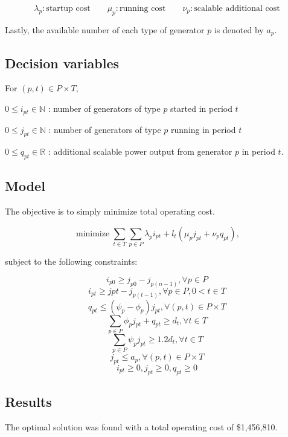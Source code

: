 \documentclass[11pt,oneside]{article}
\newcommand{\Real}{\mathbb{R}}
\newcommand{\Nat}{\mathbb{N}}
\DeclareMathOperator*{\minimize}{minimize}
\begin{document}
$$
\lambda_p : \textrm{startup cost}
\quad\quad
\mu_p : \textrm{running cost}
\quad\quad
\nu_p : \textrm{scalable additional cost}
$$

Lastly, the available number of each type of generator $p$ is denoted by $a_p$.

\subsection{Decision variables}

For $(p, t) \in P \times T$,

$0 \leq i_{pt}\in\Nat$ : number of generators of type $p$ started in period $t$

$0 \leq j_{pt}\in\Nat$ : number of generators of type $p$ running in period $t$

$0 \leq q_{pt}\in\Real$ : additional scalable power output from generator $p$ in period $t$.

\subsection{Model}

The objective is to simply minimize total operating cost.

$$
\minimize \sum_{t\in T}\sum_{p\in P}
\lambda_p i_{pt} + l_t\left( \mu_p j_{pt} + \nu_{p} q_{pt} \right),
$$

subject to the following constraints:

$$
i_{p0} \geq j_{p0} - j_{p(n-1)}, \forall p \in P
$$
$$
i_{pt} \geq j{pt} - j_{p(t-1)}, \forall p \in P, 0 < t \in T
$$
$$
q_{pt} \leq \left(\psi_p - \phi_p\right)j_{pt}, \forall (p, t) \in P\times T
$$
$$
\sum_{p\in P} \phi_p j_{pt} + q_{pt} \geq d_t, \forall t \in T
$$
$$
\sum_{p\in P} \psi_p j_{pt} \geq 1.2 d_t, \forall t \in T
$$
$$
j_{pt} \leq a_{p}, \forall (p, t) \in P \times T
$$
$$
i_{pt} \geq 0, j_{pt} \geq 0, q_{pt} \geq 0 
$$

\subsection{Results}

The optimal solution was found with a total operating cost of \$1,456,810.
\end{document}
